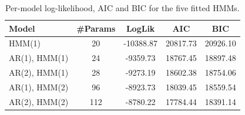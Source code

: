 \begin{table}[ht]
\centering
\begin{tabular}{lcccc}
\hline
Model & \#Params & LogLik & AIC & BIC \\
\hline
HMM(1) & 20 & -10388.87 & 20817.73 & 20926.10 \\
AR(1), HMM(1) & 24 & -9359.73 & 18767.45 & 18897.48 \\
AR(2), HMM(1) & 28 & -9273.19 & 18602.38 & 18754.06 \\
AR(1), HMM(2) & 96 & -8923.73 & 18039.45 & 18559.54 \\
AR(2), HMM(2) & 112 & -8780.22 & 17784.44 & 18391.14 \\
\hline
\end{tabular}
\caption{Per-model log-likelihood, AIC and BIC for the five fitted HMMs.}
\label{tab:model_stats}
\end{table}
